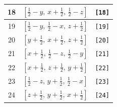 \documentclass[fleqn,8pt]{jsarticle}
\begin{document}
\begin{longtable}{ccc}
18 & $\left[ \frac{1}{2} - y,\, x + \frac{1}{2},\, \frac{1}{2} - z \right]$ & {\tt [18]} \\ \hline
19 & $\left[ \frac{1}{2} - y,\, \frac{1}{2} - x,\, z + \frac{1}{2} \right]$ & {\tt [19]} \\ \hline
20 & $\left[ y + \frac{1}{2},\, x + \frac{1}{2},\, z + \frac{1}{2} \right]$ & {\tt [20]} \\ \hline
21 & $\left[ x + \frac{1}{2},\, \frac{1}{2} - z,\, \frac{1}{2} - y \right]$ & {\tt [21]} \\ \hline
22 & $\left[ x + \frac{1}{2},\, z + \frac{1}{2},\, y + \frac{1}{2} \right]$ & {\tt [22]} \\ \hline
23 & $\left[ \frac{1}{2} - z,\, y + \frac{1}{2},\, \frac{1}{2} - x \right]$ & {\tt [23]} \\ \hline
24 & $\left[ z + \frac{1}{2},\, y + \frac{1}{2},\, x + \frac{1}{2} \right]$ & {\tt [24]} \\
\end{longtable}
\end{document}
